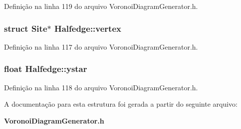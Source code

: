Definição na linha 119 do arquivo Voronoi\+Diagram\+Generator.\+h.

\subsubsection[{vertex}]{\setlength{\rightskip}{0pt plus 5cm}struct {\bf Site}$\ast$ Halfedge\+::vertex}\label{struct_halfedge_a830e87193287d542ba39523fb136f4e6}


Definição na linha 117 do arquivo Voronoi\+Diagram\+Generator.\+h.

\subsubsection[{ystar}]{\setlength{\rightskip}{0pt plus 5cm}float Halfedge\+::ystar}\label{struct_halfedge_acb2fea4056f9140358fb378c9050d2b1}


Definição na linha 118 do arquivo Voronoi\+Diagram\+Generator.\+h.



A documentação para esta estrutura foi gerada a partir do seguinte arquivo\+:\begin{DoxyCompactItemize}
\item 
{\bf Voronoi\+Diagram\+Generator.\+h}\end{DoxyCompactItemize}
